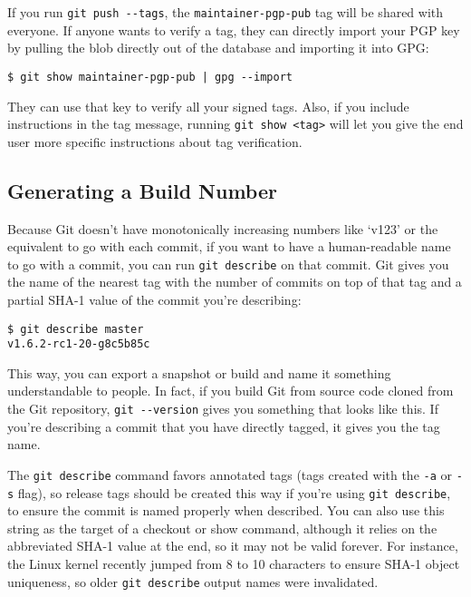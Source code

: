 \documentclass[a4paper]{book}
\newcounter{tab}[chapter]
\begin{document}
If you run \texttt{git push -{}-tags}, the \texttt{maintainer-pgp-pub} tag will be shared with everyone. If anyone wants to verify a tag, they can directly import your PGP key by pulling the blob directly out of the database and importing it into GPG:

\begin{shaded}\begin{verbatim}
$ git show maintainer-pgp-pub | gpg --import
\end{verbatim}\end{shaded}

They can use that key to verify all your signed tags. Also, if you include instructions in the tag message, running \texttt{git show \textless{}tag\textgreater{}} will let you give the end user more specific instructions about tag verification.

\subsection{Generating a Build Number}

Because Git doesn't have monotonically increasing numbers like `v123' or the equivalent to go with each commit, if you want to have a human-readable name to go with a commit, you can run \texttt{git describe} on that commit. Git gives you the name of the nearest tag with the number of commits on top of that tag and a partial SHA-1 value of the commit you're describing:

\begin{shaded}\begin{verbatim}
$ git describe master
v1.6.2-rc1-20-g8c5b85c
\end{verbatim}\end{shaded}

This way, you can export a snapshot or build and name it something understandable to people. In fact, if you build Git from source code cloned from the Git repository, \texttt{git -{}-version} gives you something that looks like this. If you're describing a commit that you have directly tagged, it gives you the tag name.

The \texttt{git describe} command favors annotated tags (tags created with the \texttt{-a} or \texttt{-s} flag), so release tags should be created this way if you're using \texttt{git describe}, to ensure the commit is named properly when described. You can also use this string as the target of a checkout or show command, although it relies on the abbreviated SHA-1 value at the end, so it may not be valid forever. For instance, the Linux kernel recently jumped from 8 to 10 characters to ensure SHA-1 object uniqueness, so older \texttt{git describe} output names were invalidated.
\end{document}
